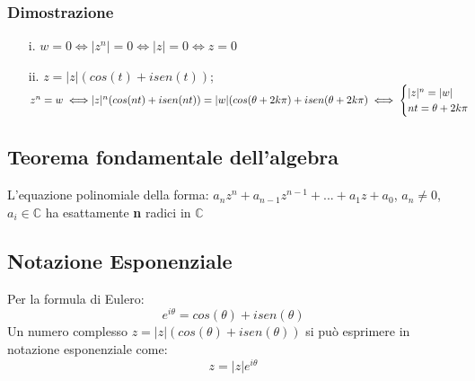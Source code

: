 \subsubsection{Dimostrazione}
\begin{enumerate}
\item[i.]$w=0 \iff |z^n|=0 \iff |z|=0 \iff z=0$
\item[ii.]$z=|z|(cos(t)+isen(t))$; $z^n=w \iff \\
|z|^n(cos(nt)+isen(nt)) = |w|(cos(\theta+2k\pi)+isen(\theta +2k\pi) \iff
\begin{cases}
|z|^n = |w|\\
nt = \theta +2k\pi
\end{cases}$
\end{enumerate}
\subsection{Teorema fondamentale dell'algebra}
L'equazione polinomiale della forma: $a_nz^n + a_{n-1}z^{n-1}+...+a_1z+a_0$, $a_n \neq 0$, $a_i \in \mathbb{C}$ ha esattamente \textbf{n} radici in $\mathbb{C}$

\subsection{Notazione Esponenziale}
Per la formula di Eulero:\\
\begin{equation}
	e^{i\theta} = cos(\theta)+isen(\theta)
\end{equation}
Un numero complesso $z = |z|(cos(\theta)+isen(\theta))$ si può esprimere in notazione esponenziale come:\\
\begin{equation}
z = |z|e^{i\theta}
\end{equation}
